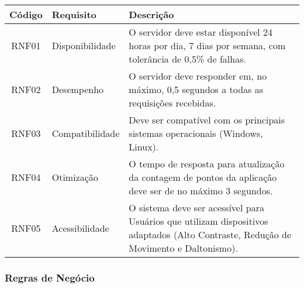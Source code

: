 \documentclass[
	article,			%
	12pt,				%
	oneside,			%
	a4paper,			%
	english,			%
	brazil,				%
	sumario=tradicional
	]{abntex2}
\begin{document}
\begin{tabular}{|c|l|p{8cm}|}
\hline
\textbf{Código} & \textbf{Requisito} & \textbf{Descrição} \\
\hline
RNF01 & Disponibilidade & O servidor deve estar disponível 24 horas por dia, 7 dias por semana, com tolerância de 0,5\% de falhas. \\
\hline
RNF02 & Desempenho & O servidor deve responder em, no máximo, 0,5 segundos a todas as requisições recebidas. \\
\hline
RNF03 & Compatibilidade & Deve ser compatível com os principais sistemas operacionais (Windows, Linux). \\
\hline
RNF04 & Otimização & O tempo de resposta para atualização da contagem de pontos da aplicação deve ser de no máximo 3 segundos. \\
\hline
RNF05 & Acessibilidade & O sistema deve ser acessível para Usuários que utilizam dispositivos adaptados (Alto Contraste, Redução de Movimento e Daltonismo). \\
\hline
\end{tabular}

\subsubsection{Regras de Negócio}
\end{document}
